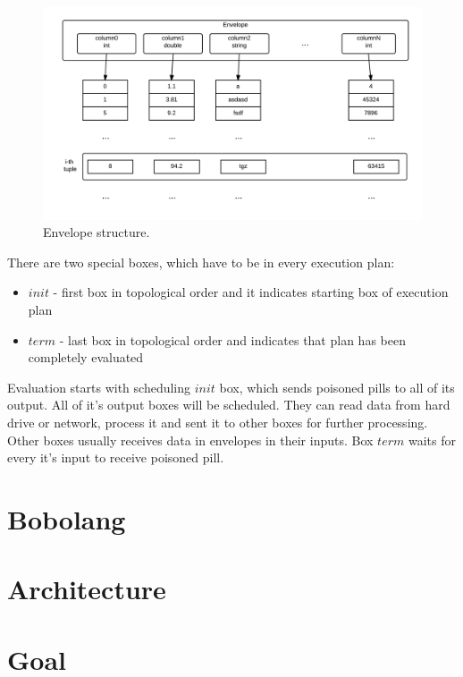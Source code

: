 \begin{figure}[h!]
  \centering
    \includegraphics[width=1\textwidth]{envelope}

      \caption{Envelope structure.}
          \label{fig:envelope}
\end{figure}
There are two special boxes, which have to be in every execution plan:
\begin{itemize}


\item $init$ - first box in topological order and it indicates starting box of execution plan

\item $term$ - last box in topological order and indicates that plan has been completely evaluated

\end{itemize}

Evaluation starts with scheduling $init$ box, which sends poisoned pills to all of its output. All of it's output boxes will be scheduled. They can read data from hard drive or network, process it and sent it to other boxes for further processing. Other boxes usually receives data in envelopes in their inputs. Box $term$ waits for every it's input to receive poisoned pill.

\section{Bobolang}

\section{Architecture}

\section{Goal}